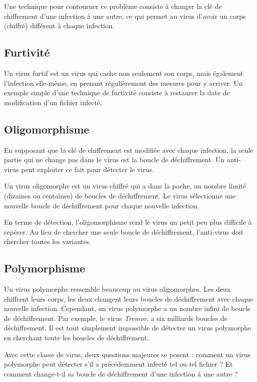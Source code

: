     Une technique pour contourner ce problème consiste à changer la clé de chiffrement d'une infection à une autre, ce
    qui permet au virus d'avoir un corps (chiffré) différent à chaque infection. \cite{virus} %

    \subsection{Furtivité}
    Un virus furtif est un virus qui cache non seulement son corps, mais également l'infection elle-même,
    en prenant régulièrement des mesures pour y arriver. 
    Un exemple simple d'une technique de furtivité consiste à restaurer la date de modification d'un fichier infecté.

    \subsection{Oligomorphisme}
    En supposant que la clé de chiffrement est modifiée avec chaque infection, la seule partie qui ne change pas
    dans le virus est la boucle de déchiffrement. Un anti-virus peut exploiter ce fait pour détecter le virus. 
    \cite{virus} %

    Un virus oligomorphe est un virus chiffré qui a dans la poche, un nombre limité (dizaines ou centaines) 
    de boucles de déchiffrement. Le virus sélectionne une nouvelle boucle de déchiffrement 
    pour chaque nouvelle infection. \cite{virus} %

    En terme de détection, l'oligomorphisme rend le virus un petit peu plus difficile à repérer. Au lieu de chercher
    une seule boucle de déchiffrement, l'anti-virus doit chercher toutes les variantes. \cite{virus} %

    \subsection{Polymorphisme}
    Un virus polymorphe ressemble beaucoup au virus oligomorphes. Les deux chiffrent leurs corps, les deux changent leurs
    boucles de déchiffrement avec chaque nouvelle infection. Cependant, un virus polymorphe a un nombre infini de 
    boucle de déchiffrement. Par exemple, le virus \emph{Tremor}, a six milliards boucles de déchiffrement. Il est
    tout simplement impossible de détecter un virus polymorphe en cherchant toute les boucles de déchiffrement. 
    \cite{virus} %

    Avec cette classe de virus, deux questions majeures se posent : comment un virus polymorphe peut détecter
    s'il a précédemment infecté tel ou tel fichier ? Et comment change-t-il sa boucle de déchiffrement d'une infection
    à une autre ? \cite{virus} %
